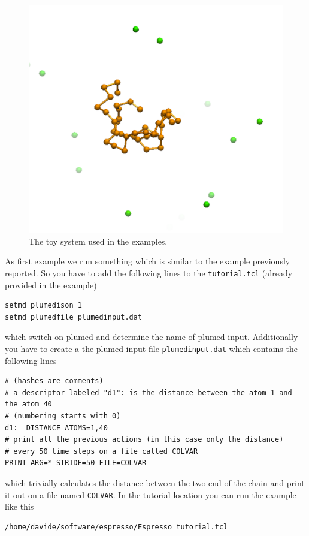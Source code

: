 \documentclass[10pt,fleqn,a4paper]{report}
\begin{document}
\begin{figure}[h!]
\begin{center}
\includegraphics[width=14cm,angle=0]{./figures/system}
\caption{The toy system used in the examples.}
\label{system}
\end{center}
\end{figure} 

As first example we run something which is similar to the example previously reported.
So you have to add the following lines to the \texttt{tutorial.tcl} (already provided in the example)
\begin{verbatim}
setmd plumedison 1
setmd plumedfile plumedinput.dat
\end{verbatim}
which switch on plumed and determine the name of plumed input.
Additionally you have to
create a the plumed input file \texttt{plumedinput.dat} which contains the following lines
\begin{verbatim}
# (hashes are comments)
# a descriptor labeled "d1": is the distance between the atom 1 and the atom 40
# (numbering starts with 0)
d1:  DISTANCE ATOMS=1,40
# print all the previous actions (in this case only the distance)
# every 50 time steps on a file called COLVAR
PRINT ARG=* STRIDE=50 FILE=COLVAR
\end{verbatim}
which trivially calculates the distance between the two end of the chain and print it out on a file named \texttt{COLVAR}.
In the tutorial location you can run the example like this
\begin{verbatim}
/home/davide/software/espresso/Espresso tutorial.tcl
\end{verbatim}
\end{document}
